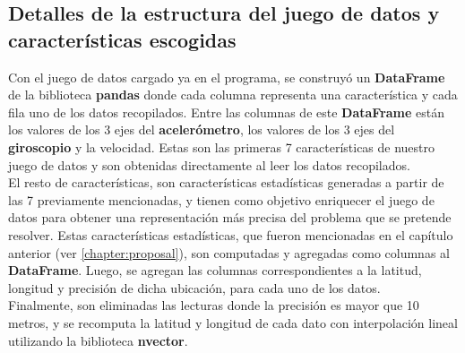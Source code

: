 	\subsection{Detalles de la estructura del juego de datos y características escogidas}
		Con el juego de datos cargado ya en el programa, se construyó un \textbf{DataFrame} de la biblioteca \textbf{pandas} donde cada columna representa
		una característica y cada fila uno de los datos recopilados. Entre las columnas de este \textbf{DataFrame} están los valores de los 3 ejes del \textbf
		{acelerómetro}, los valores de los 3 ejes del \textbf{giroscopio} y la velocidad. Estas son las primeras 7 características de nuestro juego de datos
		y son obtenidas directamente al leer los datos recopilados.\\
		\indent El resto de características, son características estadísticas generadas a partir de las 7 previamente mencionadas, y tienen como objetivo
		enriquecer el juego de datos para obtener una representación más precisa del problema que se pretende resolver. Estas características estadísticas,
		que fueron mencionadas en el capítulo anterior (ver \ref{chapter:proposal}), son computadas y agregadas como columnas al \textbf{DataFrame}.
		Luego, se agregan las columnas correspondientes a la latitud, longitud y precisión de dicha ubicación, para cada uno de los datos.\\
		\indent Finalmente, son eliminadas las lecturas donde la precisión es mayor que 10 metros, y se recomputa la latitud y longitud de cada dato con
		interpolación lineal utilizando la biblioteca \textbf{nvector}.

